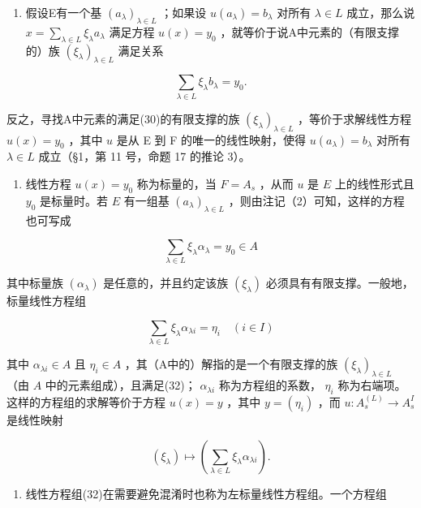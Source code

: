 \begin{enumerate}
\def\labelenumi{(\arabic{enumi})}
\setcounter{enumi}{1}
\tightlist
\item
  假设E有一个基 \((a_{\lambda})_{\lambda \in L}\) ；如果设 \(u(a_{\lambda}) = b_{\lambda}\) 对所有 \(\lambda \in L\) 成立，那么说 \(x = \sum_{\lambda \in L} \xi_{\lambda} a_{\lambda}\) 满足方程 \(u(x) = y_0\) ，就等价于说A中元素的（有限支撑的）族 \((\xi_{\lambda})_{\lambda \in L}\) 满足关系
\end{enumerate}

\[
\sum_ {\lambda \in L} \xi_ {\lambda} b _ {\lambda} = y _ {0}.\tag{30}
\]

反之，寻找A中元素的满足(30)的有限支撑的族 \((\xi_{\lambda})_{\lambda \in L}\) ，等价于求解线性方程 \(u(x) = y_0\) ，其中 \(u\) 是从 E 到 F 的唯一的线性映射，使得 \(u(a_{\lambda}) = b_{\lambda}\) 对所有 \(\lambda \in L\) 成立（§1，第 11 号，命题 17 的推论 3）。

\begin{enumerate}
\def\labelenumi{(\arabic{enumi})}
\setcounter{enumi}{2}
\tightlist
\item
  线性方程 \(u(x) = y_0\) 称为标量的，当 \(F = A_s\) ，从而 \(u\) 是 \(E\) 上的线性形式且 \(y_0\) 是标量时。若 \(E\) 有一组基 \((a_\lambda)_{\lambda \in L}\) ，则由注记（2）可知，这样的方程也可写成
\end{enumerate}

\[
\sum_ {\lambda \in L} \xi_ {\lambda} \alpha_ {\lambda} = y _ {0} \in A\tag{31}
\]

其中标量族 \((\alpha_{\lambda})\) 是任意的，并且约定该族 \((\xi_{\lambda})\) 必须具有有限支撑。一般地，标量线性方程组

\[
\sum_ {\lambda \in L} \xi_ {\lambda} \alpha_ {\lambda i} = \eta_ {i} \quad (i \in I)\tag{32}
\]

其中 \(\alpha_{\lambda i} \in A\) 且 \(\eta_i \in A\) ，其（A中的）解指的是一个有限支撑的族 \((\xi_\lambda)_{\lambda \in L}\) （由 \(A\) 中的元素组成），且满足(32)； \(\alpha_{\lambda i}\) 称为方程组的系数， \(\eta_i\) 称为右端项。这样的方程组的求解等价于方程 \(u(x) = y\) ，其中 \(y = (\eta_i)\) ，而 \(u: A_s^{(L)} \to A_s^I\) 是线性映射

\[
\left(\xi_ {\lambda}\right) \mapsto \left(\sum_ {\lambda \in L} \xi_ {\lambda} \alpha_ {\lambda i}\right).
\]

\begin{enumerate}
\def\labelenumi{(\arabic{enumi})}
\setcounter{enumi}{3}
\tightlist
\item
  线性方程组(32)在需要避免混淆时也称为左标量线性方程组。一个方程组
\end{enumerate}

